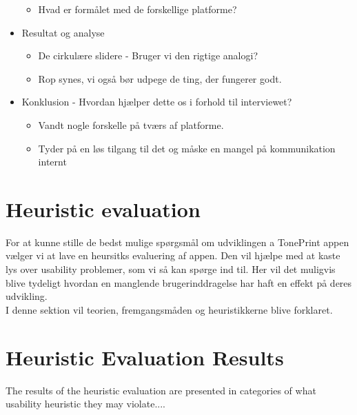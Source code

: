 \begin{itemize}
\begin{itemize}
		\item Hvad er formålet med de forskellige platforme?
	\end{itemize}
	\item Resultat og analyse
	\begin{itemize}
		\item De cirkulære slidere - Bruger vi den rigtige analogi?
		\item Rop synes, vi også bør udpege de ting, der fungerer godt.
	\end{itemize}
	\item Konklusion - Hvordan hjælper dette os i forhold til interviewet?
	\begin{itemize}
		\item Vandt nogle forskelle på tværs af platforme.
		\item Tyder på en løs tilgang til det og måske en mangel på kommunikation internt
	\end{itemize}
\end{itemize}

\section{Heuristic evaluation}
\label{SectionHeuristicEvaluation}
For at kunne stille de bedst mulige spørgsmål om udviklingen a TonePrint appen vælger vi at lave en heursitks evaluering af appen. Den vil hjælpe med at kaste lys over usability problemer, som vi så kan spørge ind til. Her vil det muligvis blive tydeligt hvordan en manglende brugerinddragelse har haft en effekt på deres udvikling. \\
I denne sektion vil teorien, fremgangsmåden og heuristikkerne blive forklaret.

\section{Heuristic Evaluation Results}
\label{Heuristic_Results}
The results of the heuristic evaluation are presented in categories of what usability heuristic they may violate....

